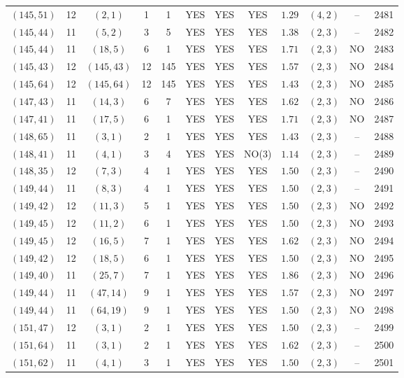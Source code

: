 \begin{longtable}{|c|c|c|c|c|c|c|c|c|c|c|c|}
$(145,51)$ & 12 & $(2,1)$ & 1 & 1 & YES & YES & YES & $1.29$ & $(4,2)$ & -- & 2481\\
$(145,44)$ & 11 & $(5,2)$ & 3 & 5 & YES & YES & YES & $1.38$ & $(2,3)$ & -- & 2482\\
$(145,44)$ & 11 & $(18,5)$ & 6 & 1 & YES & YES & YES & $1.71$ & $(2,3)$ & NO & 2483\\
$(145,43)$ & 12 & $(145,43)$ & 12 & 145 & YES & YES & YES & $1.57$ & $(2,3)$ & NO & 2484\\
$(145,64)$ & 12 & $(145,64)$ & 12 & 145 & YES & YES & YES & $1.43$ & $(2,3)$ & NO & 2485\\
$(147,43)$ & 11 & $(14,3)$ & 6 & 7 & YES & YES & YES & $1.62$ & $(2,3)$ & NO & 2486\\
$(147,41)$ & 11 & $(17,5)$ & 6 & 1 & YES & YES & YES & $1.71$ & $(2,3)$ & NO & 2487\\
$(148,65)$ & 11 & $(3,1)$ & 2 & 1 & YES & YES & YES & $1.43$ & $(2,3)$ & -- & 2488\\
$(148,41)$ & 11 & $(4,1)$ & 3 & 4 & YES & YES & NO(3) & $1.14$ & $(2,3)$ & -- & 2489\\
$(148,35)$ & 12 & $(7,3)$ & 4 & 1 & YES & YES & YES & $1.50$ & $(2,3)$ & -- & 2490\\
$(149,44)$ & 11 & $(8,3)$ & 4 & 1 & YES & YES & YES & $1.50$ & $(2,3)$ & -- & 2491\\
$(149,42)$ & 12 & $(11,3)$ & 5 & 1 & YES & YES & YES & $1.50$ & $(2,3)$ & NO & 2492\\
$(149,45)$ & 12 & $(11,2)$ & 6 & 1 & YES & YES & YES & $1.50$ & $(2,3)$ & NO & 2493\\
$(149,45)$ & 12 & $(16,5)$ & 7 & 1 & YES & YES & YES & $1.62$ & $(2,3)$ & NO & 2494\\
$(149,42)$ & 12 & $(18,5)$ & 6 & 1 & YES & YES & YES & $1.50$ & $(2,3)$ & NO & 2495\\
$(149,40)$ & 11 & $(25,7)$ & 7 & 1 & YES & YES & YES & $1.86$ & $(2,3)$ & NO & 2496\\
$(149,44)$ & 11 & $(47,14)$ & 9 & 1 & YES & YES & YES & $1.57$ & $(2,3)$ & NO & 2497\\
$(149,44)$ & 11 & $(64,19)$ & 9 & 1 & YES & YES & YES & $1.50$ & $(2,3)$ & NO & 2498\\
$(151,47)$ & 12 & $(3,1)$ & 2 & 1 & YES & YES & YES & $1.50$ & $(2,3)$ & -- & 2499\\
$(151,64)$ & 11 & $(3,1)$ & 2 & 1 & YES & YES & YES & $1.62$ & $(2,3)$ & -- & 2500\\
$(151,62)$ & 11 & $(4,1)$ & 3 & 1 & YES & YES & YES & $1.50$ & $(2,3)$ & -- & 2501\\

\end{longtable}
